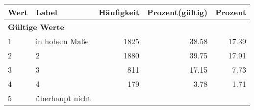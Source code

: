     \begin{longtable}{lXrrr}
     \toprule
     \textbf{Wert} & \textbf{Label} & \textbf{Häufigkeit} & \textbf{Prozent(gültig)} & \textbf{Prozent} \\
     \endhead
     \midrule
     \multicolumn{5}{l}{\textbf{Gültige Werte}}\\

     1 &
     \multicolumn{1}{X}{ in hohem Maße   } &


       \num{1825} &
       \num[round-mode=places,round-precision=2]{38,58} &
         \num[round-mode=places,round-precision=2]{17,39} \\

     2 &
     \multicolumn{1}{X}{ 2   } &


       \num{1880} &
       \num[round-mode=places,round-precision=2]{39,75} &
         \num[round-mode=places,round-precision=2]{17,91} \\

     3 &
     \multicolumn{1}{X}{ 3   } &


       \num{811} &
       \num[round-mode=places,round-precision=2]{17,15} &
         \num[round-mode=places,round-precision=2]{7,73} \\

     4 &
     \multicolumn{1}{X}{ 4   } &


       \num{179} &
       \num[round-mode=places,round-precision=2]{3,78} &
         \num[round-mode=places,round-precision=2]{1,71} \\

     5 &
     \multicolumn{1}{X}{ überhaupt nicht   } &



\end{longtable}

